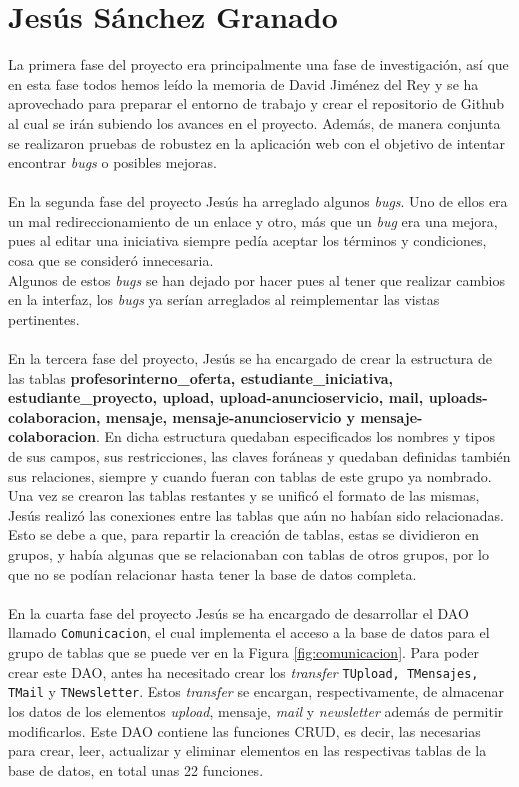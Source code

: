 \documentclass[11pt]{book}
\begin{document}
	\section{Jesús Sánchez Granado}
	La primera fase del proyecto era principalmente una fase de investigación, así que en esta fase todos hemos leído la memoria de David Jiménez del Rey y se ha aprovechado para preparar el entorno de trabajo y crear el repositorio de Github al cual se irán subiendo los avances en el proyecto. Además, de manera conjunta se realizaron pruebas de robustez en la aplicación web con el objetivo de intentar encontrar \emph{bugs} o posibles mejoras.\\\\
	En la segunda fase del proyecto Jesús ha arreglado algunos \emph{bugs}. Uno de ellos era un mal redireccionamiento de un enlace y otro, más que un \emph{bug} era una mejora, pues al editar una iniciativa siempre pedía aceptar los términos y condiciones, cosa que se consideró innecesaria.\\
	Algunos de estos \emph{bugs} se han dejado por hacer pues al tener que realizar cambios en la interfaz, los \emph{bugs} ya serían arreglados al reimplementar las vistas pertinentes.\\\\
	En la tercera fase del proyecto, Jesús se ha encargado de crear la estructura de las tablas \textbf{profesorinterno\_oferta, estudiante\_iniciativa, estudiante\_proyecto, upload, upload-anuncioservicio, mail, uploads-colaboracion, mensaje, mensaje-anuncioservicio y mensaje-colaboracion}. En dicha estructura quedaban especificados los nombres y tipos de sus campos, sus restricciones, las claves foráneas y quedaban definidas también sus relaciones, siempre y cuando fueran con tablas de este grupo ya nombrado.\\
	Una vez se crearon las tablas restantes y se unificó el formato de las mismas, Jesús realizó las conexiones entre las tablas que aún no habían sido relacionadas. Esto se debe a que, para repartir la creación de tablas, estas se dividieron en grupos, y había algunas que se relacionaban con tablas de otros grupos, por lo que no se podían relacionar hasta tener la base de datos completa.\\\\
	En la cuarta fase del proyecto Jesús se ha encargado de desarrollar el DAO llamado \texttt{Comunicacion}, el cual implementa el acceso a la base de datos para el grupo de tablas que se puede ver en la Figura \ref{fig:comunicacion}. Para poder crear este DAO, antes ha necesitado crear los \emph{transfer} \texttt{TUpload, TMensajes, TMail} y \texttt{TNewsletter}. Estos \emph{transfer} se encargan, respectivamente, de almacenar los datos de los elementos \textit{upload}, mensaje, \textit{mail} y \textit{newsletter} además de permitir modificarlos. Este DAO contiene las funciones CRUD, es decir, las necesarias para crear, leer, actualizar y eliminar elementos en las respectivas tablas de la base de datos, en total unas 22 funciones. \\
\end{document}
